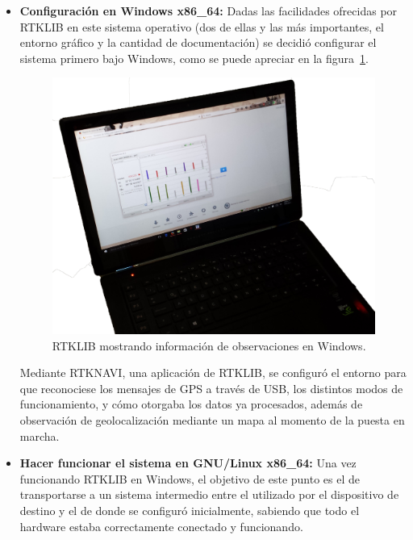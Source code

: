 \begin{itemize}
\item \textbf{Configuración en Windows x86\_64:} Dadas las facilidades ofrecidas por RTKLIB en este sistema operativo (dos de ellas y las más importantes, el entorno gráfico y la cantidad de documentación) se decidió configurar el sistema primero bajo Windows, como se puede apreciar en la figura~\ref{fig:RTKWin}. \\

\begin{figure}[H]
\centering
\includegraphics[scale=0.47]{Figures/BaseStatWin}
\caption[RTKLIB mostrando información de observaciones en Windows.]{RTKLIB mostrando información de observaciones en Windows.}
\label{fig:RTKWin}
\end{figure}

Mediante RTKNAVI, una aplicación de RTKLIB, se configuró el entorno para que reconociese los mensajes de GPS a través de USB, los distintos modos de funcionamiento, y cómo otorgaba los datos ya procesados, además de observación de geolocalización mediante un mapa al momento de la puesta en marcha.\\

\item \textbf{Hacer funcionar el sistema en GNU/Linux x86\_64:} Una vez funcionando RTKLIB en Windows, el objetivo de este punto es el de transportarse a un sistema intermedio entre el utilizado por el dispositivo de destino y el de donde se configuró inicialmente, sabiendo que todo el hardware estaba correctamente conectado y funcionando.\\ 


\end{itemize}
